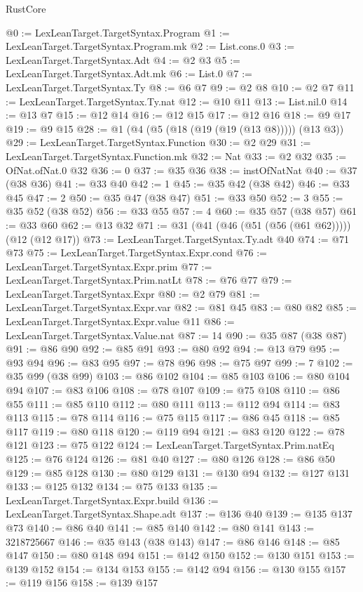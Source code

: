 \begin{lexlean}{RustCore}
\begin{coremodule}
@0 := LexLeanTarget.TargetSyntax.Program
@1 := LexLeanTarget.TargetSyntax.Program.mk
@2 := List.cons.{0}
@3 := LexLeanTarget.TargetSyntax.Adt
@4 := @2 @3
@5 := LexLeanTarget.TargetSyntax.Adt.mk
@6 := List.{0}
@7 := LexLeanTarget.TargetSyntax.Ty
@8 := @6 @7
@9 := @2 @8
@10 := @2 @7
@11 := LexLeanTarget.TargetSyntax.Ty.nat
@12 := @10 @11
@13 := List.nil.{0}
@14 := @13 @7
@15 := @12 @14
@16 := @12 @15
@17 := @12 @16
@18 := @9 @17
@19 := @9 @15
@28 := @1 (@4 (@5 (@18 (@19 (@19 (@13 @8))))) (@13 @3))
@29 := LexLeanTarget.TargetSyntax.Function
@30 := @2 @29
@31 := LexLeanTarget.TargetSyntax.Function.mk
@32 := Nat
@33 := @2 @32
@35 := OfNat.ofNat.{0} @32
@36 := 0
@37 := @35 @36
@38 := instOfNatNat
@40 := @37 (@38 @36)
@41 := @33 @40
@42 := 1
@45 := @35 @42 (@38 @42)
@46 := @33 @45
@47 := 2
@50 := @35 @47 (@38 @47)
@51 := @33 @50
@52 := 3
@55 := @35 @52 (@38 @52)
@56 := @33 @55
@57 := 4
@60 := @35 @57 (@38 @57)
@61 := @33 @60
@62 := @13 @32
@71 := @31 (@41 (@46 (@51 (@56 (@61 @62))))) (@12 (@12 @17))
@73 := LexLeanTarget.TargetSyntax.Ty.adt @40
@74 := @71 @73
@75 := LexLeanTarget.TargetSyntax.Expr.cond
@76 := LexLeanTarget.TargetSyntax.Expr.prim
@77 := LexLeanTarget.TargetSyntax.Prim.natLt
@78 := @76 @77
@79 := LexLeanTarget.TargetSyntax.Expr
@80 := @2 @79
@81 := LexLeanTarget.TargetSyntax.Expr.var
@82 := @81 @45
@83 := @80 @82
@85 := LexLeanTarget.TargetSyntax.Expr.value @11
@86 := LexLeanTarget.TargetSyntax.Value.nat
@87 := 14
@90 := @35 @87 (@38 @87)
@91 := @86 @90
@92 := @85 @91
@93 := @80 @92
@94 := @13 @79
@95 := @93 @94
@96 := @83 @95
@97 := @78 @96
@98 := @75 @97
@99 := 7
@102 := @35 @99 (@38 @99)
@103 := @86 @102
@104 := @85 @103
@106 := @80 @104 @94
@107 := @83 @106
@108 := @78 @107
@109 := @75 @108
@110 := @86 @55
@111 := @85 @110
@112 := @80 @111
@113 := @112 @94
@114 := @83 @113
@115 := @78 @114
@116 := @75 @115
@117 := @86 @45
@118 := @85 @117
@119 := @80 @118
@120 := @119 @94
@121 := @83 @120
@122 := @78 @121
@123 := @75 @122
@124 := LexLeanTarget.TargetSyntax.Prim.natEq
@125 := @76 @124
@126 := @81 @40
@127 := @80 @126
@128 := @86 @50
@129 := @85 @128
@130 := @80 @129
@131 := @130 @94
@132 := @127 @131
@133 := @125 @132
@134 := @75 @133
@135 := LexLeanTarget.TargetSyntax.Expr.build
@136 := LexLeanTarget.TargetSyntax.Shape.adt
@137 := @136 @40
@139 := @135 @137 @73
@140 := @86 @40
@141 := @85 @140
@142 := @80 @141
@143 := 3218725667
@146 := @35 @143 (@38 @143)
@147 := @86 @146
@148 := @85 @147
@150 := @80 @148 @94
@151 := @142 @150
@152 := @130 @151
@153 := @139 @152
@154 := @134 @153
@155 := @142 @94
@156 := @130 @155
@157 := @119 @156
@158 := @139 @157

\end{coremodule}
\end{lexlean}
